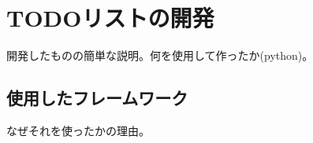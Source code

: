\chapter{TODOリストの開発}
\label{cha:Development}
開発したものの簡単な説明。何を使用して作ったか(python)。

\section{使用したフレームワーク}
なぜそれを使ったかの理由。